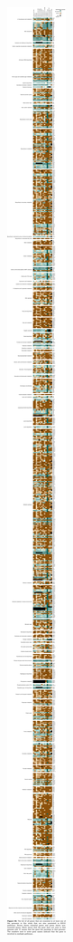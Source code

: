\documentclass{article}
\newcommand{\Newpage}{\end{preview}\begin{preview}}
\begin{document}
\begin{preview}
\includegraphics{suppl8.pdf}
\Newpage

\end{preview}
\end{document}
